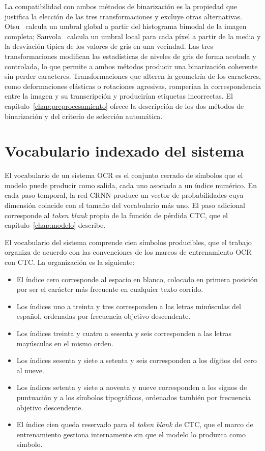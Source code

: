La compatibilidad con ambos métodos de binarización es la propiedad que justifica la elección de las tres transformaciones y excluye otras alternativas. Otsu~\cite{otsu1979threshold} calcula un umbral global a partir del histograma bimodal de la imagen completa; Sauvola~\cite{sauvola2000binarization} calcula un umbral local para cada píxel a partir de la media y la desviación típica de los valores de gris en una vecindad. Las tres transformaciones modifican las estadísticas de niveles de gris de forma acotada y controlada, lo que permite a ambos métodos producir una binarización coherente sin perder caracteres. Transformaciones que alteren la geometría de los caracteres, como deformaciones elásticas o rotaciones agresivas, romperían la correspondencia entre la imagen y su transcripción y producirían etiquetas incorrectas. El capítulo~\ref{chap:preprocesamiento} ofrece la descripción de los dos métodos de binarización y del criterio de selección automática.

\section{Vocabulario indexado del sistema}
\label{sec:vocabulario}

El vocabulario de un sistema OCR es el conjunto cerrado de símbolos que el modelo puede producir como salida, cada uno asociado a un índice numérico. En cada paso temporal, la red CRNN produce un vector de probabilidades cuya dimensión coincide con el tamaño del vocabulario más uno. El paso adicional corresponde al \textit{token blank} propio de la función de pérdida CTC, que el capítulo~\ref{chap:modelo} describe.

El vocabulario del sistema comprende cien símbolos producibles, que el trabajo organiza de acuerdo con las convenciones de los marcos de entrenamiento OCR con CTC. La organización es la siguiente:

\begin{itemize}
	\item El índice cero corresponde al espacio en blanco, colocado en primera posición por ser el carácter más frecuente en cualquier texto corrido.
	\item Los índices uno a treinta y tres corresponden a las letras minúsculas del español, ordenadas por frecuencia objetivo descendente.
	\item Los índices treinta y cuatro a sesenta y seis corresponden a las letras mayúsculas en el mismo orden.
	\item Los índices sesenta y siete a setenta y seis corresponden a los dígitos del cero al nueve.
	\item Los índices setenta y siete a noventa y nueve corresponden a los signos de puntuación y a los símbolos tipográficos, ordenados también por frecuencia objetivo descendente.
	\item El índice cien queda reservado para el \textit{token blank} de CTC, que el marco de entrenamiento gestiona internamente sin que el modelo lo produzca como símbolo.
\end{itemize}

